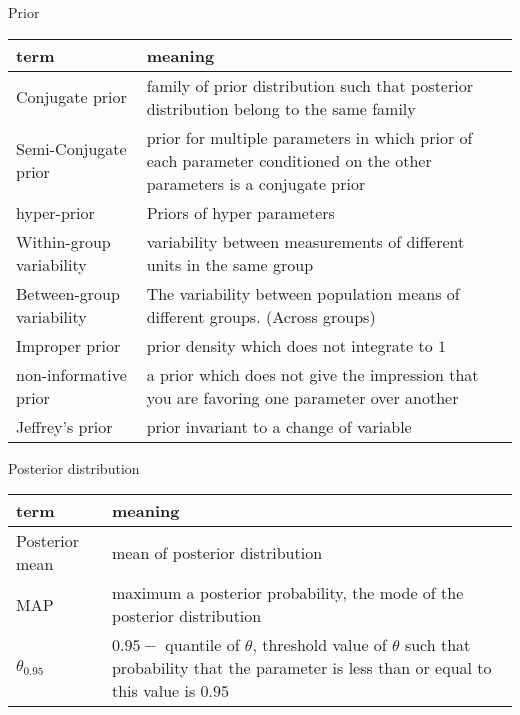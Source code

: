     Prior\\
    \begin{tabulary}{\linewidth}{l L}
        \hline
        term & meaning\\
        \hline
        \hline
        Conjugate prior & family of prior distribution such
        that posterior distribution belong to the same
        family\\
        Semi-Conjugate prior & prior for multiple parameters
        in which prior of each parameter conditioned on the
        other parameters is a conjugate prior\\
        hyper-prior & Priors of hyper parameters\\
        Within-group variability & variability between
        measurements of different units in the same group\\
        Between-group variability & The variability between
        population means of different groups. (Across groups)\\
        Improper prior & prior density which does not
        integrate to $1$\\
        non-informative prior & a prior which does not give
        the impression that you are favoring one parameter
        over another\\
        Jeffrey's prior & prior invariant to a change of
        variable
    \end{tabulary}

    Posterior distribution\\
    \begin{tabulary}{\linewidth}{l L}
        \hline
        term & meaning\\
        \hline
        \hline
        Posterior mean & mean of posterior distribution\\
        MAP & maximum a posterior probability, the mode of
        the posterior distribution\\
        $\theta_{0.95}$ & $0.95-$ quantile of $\theta$,
        threshold value of $\theta$ such that probability
        that the parameter is less than or equal to this
        value is $0.95$
    \end{tabulary}

